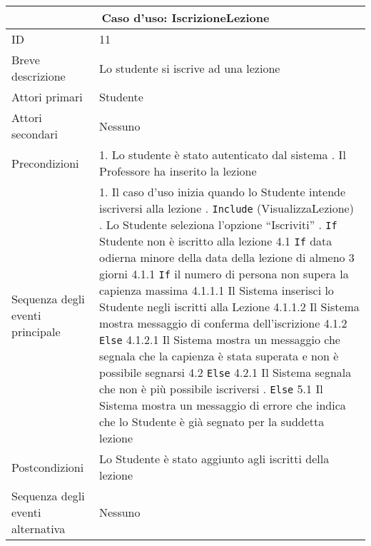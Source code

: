 \documentclass[11pt,a4paper]{report}
\begin{document}
\begin{table}[h!]
\centering
\renewcommand{\arraystretch}{1.3}
\begin{tabular}{|p{4cm}|p{10cm}|}
\hline
\multicolumn{2}{|c|}{\textbf{Caso d’uso: IscrizioneLezione}} \\ \hline
ID & 11 \\ \hline
Breve descrizione & Lo studente si iscrive ad una lezione \\ \hline
Attori primari & Studente \\ \hline
Attori secondari & Nessuno \\ \hline
Precondizioni &
1. Lo studente è stato autenticato dal sistema \newline
2. Il Professore ha inserito la lezione \\ \hline
Sequenza degli eventi principale &
1. Il caso d’uso inizia quando lo Studente intende iscriversi alla lezione \newline
2. \texttt{Include} (VisualizzaLezione) \newline
3. Lo Studente seleziona l’opzione “Iscriviti” \newline
4. \texttt{If} Studente non è iscritto alla lezione \newline
\hspace*{0.5cm} 4.1 \texttt{If} data odierna minore della data della lezione di almeno 3 giorni \newline
\hspace*{1cm} 4.1.1 \texttt{If} il numero di persona non supera la capienza massima \newline
\hspace*{1.5cm} 4.1.1.1 Il Sistema inserisci lo Studente negli iscritti alla Lezione \newline
\hspace*{1.5cm} 4.1.1.2 Il Sistema mostra messaggio di conferma dell’iscrizione \newline
\hspace*{1cm} 4.1.2 \texttt{Else} \newline
\hspace*{1.5cm} 4.1.2.1 Il Sistema mostra un messaggio che segnala che la capienza è stata superata e non è possibile segnarsi \newline
\hspace*{0.5cm} 4.2 \texttt{Else} \newline
\hspace*{1cm} 4.2.1 Il Sistema segnala che non è più possibile iscriversi \newline
5. \texttt{Else} \newline
\hspace*{0.5cm} 5.1 Il Sistema mostra un messaggio di errore che indica che lo Studente è già segnato per la suddetta lezione \\ \hline
Postcondizioni & Lo Studente è stato aggiunto agli iscritti della lezione \\ \hline
Sequenza degli eventi alternativa & Nessuno \\ \hline
\end{tabular}
\end{table}
\newpage
\end{document}
